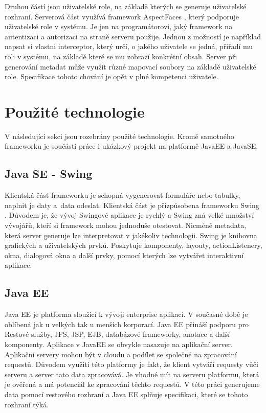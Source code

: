 Druhou částí jsou uživatelské role, na základě kterých se generuje uživatelské rozhraní. Serverová část využívá framework AspectFaces \cite{aspectfaces}, který podporuje uživatelské role v systému. Je jen na programátorovi, jaký framework na autentizaci a autorizaci na straně serveru použije. Jednou z možností je například napsat si vlastni interceptor, který určí, o jakého uživatele se jedná, přiřadí mu roli v systému, na základě které se mu zobrazí konkrétní obsah. Server při generování metadat může využít různé mapovací soubory na základě uživatelské role. Specifikace tohoto chování je opět v plné kompetenci uživatele.
\section{Použité technologie}
V následující sekci jsou rozebrány použité technologie. Kromě samotného frameworku je součástí práce i ukázkový projekt na platformě JavaEE a JavaSE.
\subsection{Java SE - Swing}
Klientská část frameworku je schopná vygenerovat formuláře nebo tabulky, naplnit je daty a~data odeslat. Klientská část je přizpůsobena frameworku Swing \cite{swing}. Důvodem je, že vývoj Swingové aplikace je rychlý a Swing zná velké množství vývojářů, kteří si framework mohou jednoduše otestovat. Nicméně metadata, která server generuje lze interpretovat v jakékoliv technologii. Swing je knihovna grafických a uživatelských prvků. Poskytuje komponenty, layouty, actionListenery, okna, dialogová okna a další prvky, pomocí kterých lze vytvářet interaktivní aplikace.
\subsection{Java EE}
Java EE je platforma sloužící k vývoji enterprise aplikací. V současné době je oblíbená jak u velkých tak u menších korporací. Java EE přináší podporu pro Restové služby, JFS, JSP, EJB, databázové frameworky, anotace a další komponenty. Aplikace v JavaEE se obvykle nasazuje na aplikační server. Aplikační servery mohou být v cloudu a podílet se společně na zpracování requestů. Důvodem využití této platformy je fakt, že klient vytváří requesty vůči serveru a server tato data zpracovává. Je vhodné mít na serveru platformu, která je ověřená a má potenciál ke zpracování těchto requestů. V této práci generujeme data pomocí restového rozhraní a Java EE splňuje specifikaci, které se tohoto rozhraní týká. 
